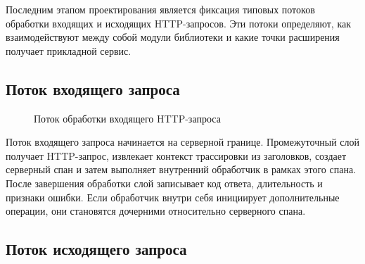 Последним этапом проектирования является фиксация типовых потоков обработки
входящих и исходящих HTTP-запросов. Эти потоки определяют, как взаимодействуют
между собой модули библиотеки и какие точки расширения получает прикладной сервис.

\subsection{Поток входящего запроса}

\begin{figure}[H]
    \centering
    \caption{Поток обработки входящего HTTP-запроса}
    \label{fig:incoming-flow}
\end{figure}

Поток входящего запроса начинается на серверной границе. Промежуточный слой
получает HTTP-запрос, извлекает контекст трассировки из заголовков, создает
серверный спан и затем выполняет внутренний обработчик в рамках этого спана.
После завершения обработки слой записывает код ответа, длительность и признаки
ошибки. Если обработчик внутри себя инициирует дополнительные операции, они
становятся дочерними относительно серверного спана.

\subsection{Поток исходящего запроса}

